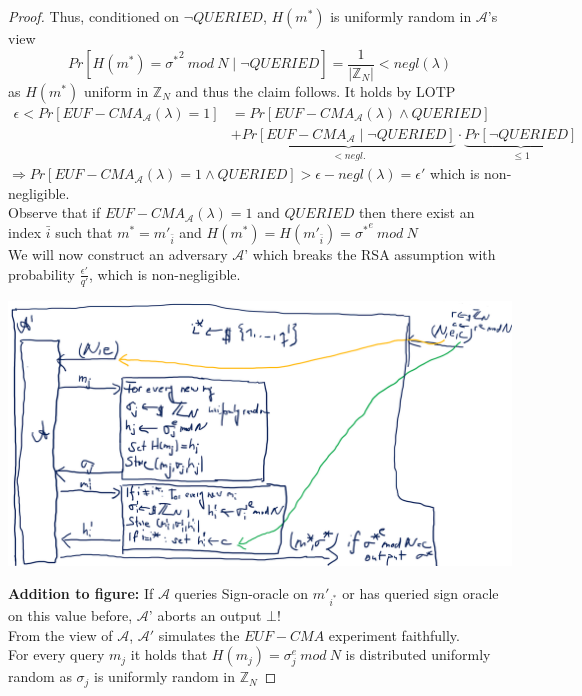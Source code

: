 \begin{proof}
            Thus, conditioned on $\neg QUERIED$, $H(m^*)$ is uniformly random in $\mathcal{A}$'s view
            $$Pr[H(m^*) = {\sigma^*}^2\ mod\ N \mid \neg QUERIED] = \frac{1}{|\mathbb{Z}_N|} < negl(\lambda)$$
            as $H(m^*)$ uniform in $\mathbb{Z}_N$ and thus the claim follows. It holds by LOTP
            \begin{align*}
                \epsilon < Pr[EUF-CMA_{\mathcal{A}}(\lambda)=1] &= Pr[EUF-CMA_{\mathcal{A}}(\lambda) \wedge QUERIED]\\
                        &+ \underbrace{Pr[EUF-CMA_{\mathcal{A}} \mid \neg QUERIED]}_{< negl.} \cdot \underbrace{Pr[\neg QUERIED]}_{\leq 1}
            \end{align*}
            $\Rightarrow Pr[EUF-CMA_{\mathcal{A}}(\lambda)=1 \wedge QUERIED] > \epsilon - negl(\lambda) = \epsilon'$ which is non-negligible.\\
            Observe that if $EUF-CMA_{\mathcal{A}}(\lambda) = 1$ and $QUERIED$ then there exist an index $\bar{i}$ such that $m^* = m'_{\bar{i}}$ and $H(m^*) = H(m'_{\bar{i}}) = {\sigma^*}^e \ mod\ N$\\
            We will now construct an adversary $\mathcal{A}$' which breaks the RSA assumption with probability $\frac{\epsilon'}{q'}$, which is non-negligible.
            \begin{center}
	            \includegraphics[width=160mm]{Graphics/Digital Signatures/ds6.png}
            \end{center}
            \textbf{Addition to figure:} If $\mathcal{A}$ queries Sign-oracle on $m'_{i^*}$ or has queried sign oracle on this value before, 
            $\mathcal{A}$' aborts an output $\bot$!\\
            From the view of $\mathcal{A}$, $\mathcal{A}'$ simulates the $EUF-CMA$ experiment faithfully.\\
            For every query $m_j$ it holds that $H(m_j) = \sigma^e_j \ mod\ N$ is distributed uniformly random as $\sigma_j$ is uniformly random in $\mathbb{Z}_N$

\end{proof}
